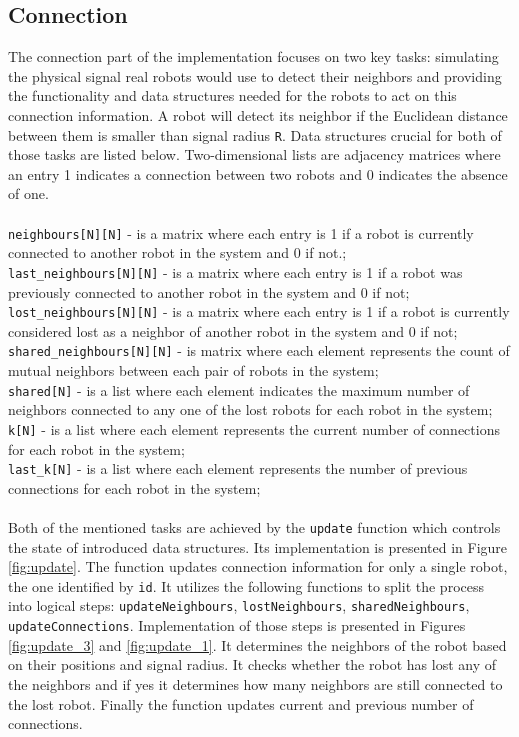 \subsection{Connection}
The connection part of the implementation focuses on two key tasks: simulating the physical signal real robots would use to detect their neighbors and providing the functionality and data structures needed for the robots to act on this connection information. A robot will detect its neighbor if the Euclidean distance between them is smaller than signal radius \texttt{R}. Data structures crucial for both of those tasks are listed below. Two-dimensional lists are adjacency matrices where an entry 1 indicates a connection between two robots and 0 indicates the absence of one. \\\\
\texttt{neighbours[N][N]} - is a matrix where each entry is 1 if a robot is currently connected to another robot in the system and 0 if not.;\\
\texttt{last\_neighbours[N][N]} - is a matrix where each entry is 1 if a robot was previously connected to another robot in the system and 0 if not;\\ 
\texttt{lost\_neighbours[N][N]} - is a matrix where each entry is 1 if a robot is currently considered lost as a neighbor of another robot in the system and 0 if not;\\
\texttt{shared\_neighbours[N][N]} - is matrix where each element represents the count of mutual neighbors between each pair of robots in the system;\\
\texttt{shared[N]} - is a list where each element indicates the maximum number of neighbors connected to any one of the lost robots for each robot in the system;\\
\texttt{k[N]} - is a list where each element represents the current number of connections for each robot in the system;\\
\texttt{last\_k[N]} - is a list where each element represents the number of previous connections for each robot in the system;\\
\\
Both of the mentioned tasks are achieved by the \texttt{update} function which controls the state of introduced data structures. Its implementation is presented in Figure \ref{fig:update}. The function updates connection information for only a single robot, the one identified by \texttt{id}. It utilizes the following functions to split the process into logical steps: \texttt{updateNeighbours}, \texttt{lostNeighbours}, \texttt{sharedNeighbours}, \texttt{updateConnections}. Implementation of those steps is presented in Figures \ref{fig:update_3} and \ref{fig:update_1}. It determines the neighbors of the robot based on their positions and signal radius. It checks whether the robot has lost any of the neighbors and if yes it determines how many neighbors are still connected to the lost robot. Finally the function updates current and previous number of connections.

